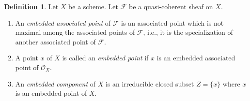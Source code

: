 \documentclass[10pt,a4paper]{amsart}
\theoremstyle{plain}
\theoremstyle{definition}
\newtheorem{definition}[subsection]{Definition}
\theoremstyle{remark}
\numberwithin{equation}{subsection}
\begin{document}
\begin{definition}
\label{definition-embedded}
Let $X$ be a scheme.
Let $\mathcal{F}$ be a quasi-coherent sheaf on $X$.
\begin{enumerate}
\item An {\it embedded associated point} of $\mathcal{F}$
is an associated point which is not maximal among the
associated points of $\mathcal{F}$, i.e., it is the specialization
of another associated point of $\mathcal{F}$.
\item A point $x$ of $X$ is called an {\it embedded point}
if $x$ is an embedded associated point of $\mathcal{O}_X$.
\item An {\it embedded component} of $X$ is an irreducible
closed subset $Z = \overline{\{x\}}$ where $x$ is an embedded
point of $X$.
\end{enumerate}
\end{definition}
\end{document}
